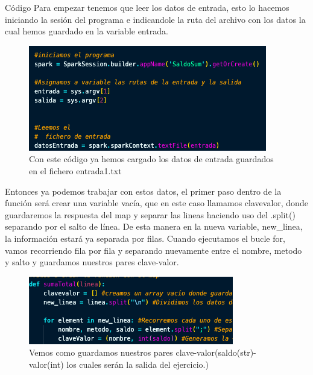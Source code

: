 \documentclass[a4paper]{article}
\begin{document}
\begin{section}{Código}  
    Para empezar tenemos que leer los datos de entrada, esto lo hacemos iniciando la sesión del programa e indicandole la ruta del archivo
    con los datos la cual hemos guardado en la variable entrada.
    \begin{figure}[h]
        \centering
        \includegraphics[width=\textwidth, keepaspectratio]{codigo1}
        \caption{Con este código ya hemos cargado los datos de entrada guardados en el fichero entrada1.txt}
    \end{figure}
    Entonces ya podemos trabajar con estos datos, el primer paso dentro de la función será crear una variable vacía, que en este caso llamamos clavevalor, donde guardaremos la respuesta del map y separar las lineas haciendo uso del .split() separando por el salto de línea.
    De esta manera en la nueva variable, new\_linea, la información estará ya separada por filas. Cuando ejecutamos el bucle for, vamos recorriendo fila por fila y separando nuevamente entre el nombre, metodo y salto y guardamos nuestros pares clave-valor.
    \begin{figure}[h]
        \centering
        \includegraphics[width=\textwidth, keepaspectratio]{codigo2}
        \caption{Vemos como guardamos nuestros pares clave-valor(saldo(str)-valor(int) los cuales serán la salida del ejercicio.)}
    \end{figure}
    

\end{section}
\end{document}
